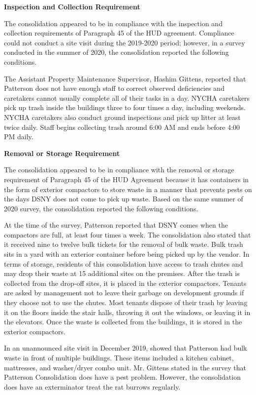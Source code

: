 

\textbf{Inspection and Collection Requirement}

The consolidation appeared to be in compliance with the inspection and collection requirements of Paragraph 45 of the HUD agreement. Compliance could not conduct a site visit during the 2019-2020 period; however, in a survey conducted in the summer of 2020, the consolidation reported the following conditions.

The Assistant Property Maintenance Supervisor, Hashim Gittens, reported that Patterson does not have enough staff to correct observed deficiencies and caretakers cannot usually complete all of their tasks in a day. NYCHA caretakers pick up trash inside the buildings three to four times a day, including weekends. NYCHA caretakers also conduct ground inspections and pick up litter at least twice daily. Staff begins collecting trash around 6:00 AM and ends before 4:00 PM daily.

\textbf{Removal or Storage Requirement}

The consolidation appeared to be in compliance with the removal or storage requirement of Paragraph  45 of the HUD Agreement because it has containers in the form of exterior compactors to store waste in a manner that prevents pests on the days DSNY does not come to pick up waste. Based on the same summer of 2020 survey, the consolidation reported the following conditions. 

At the time of the survey, Patterson reported that DSNY comes when the compactors are full, at least four times a week. The consolidation also stated that it received nine to twelve bulk tickets for the removal of bulk waste. Bulk trash sits in a yard with an exterior container before being picked up by the vendor. In terms of storage, residents of this consolidation have access to trash chutes and may drop their waste at 15 additional sites on the premises. After the trash is collected from the drop-off sites, it is placed in the exterior compactors. Tenants are asked by management not to leave their garbage on development grounds if they choose not to use the chutes. Most tenants dispose of their trash by leaving it on the floors inside the stair halls, throwing it out the windows, or leaving it in the elevators. Once the waste is collected from the buildings, it is stored in the exterior compactors.  

In an unannounced site visit in December 2019, showed that Patterson had bulk waste in front of multiple buildings. These items included  a kitchen cabinet, mattresses, and washer/dryer combo unit. Mr. Gittens stated in the survey that Patterson Consolidation does have a pest problem. However, the consolidation does have an exterminator treat the rat burrows regularly.

